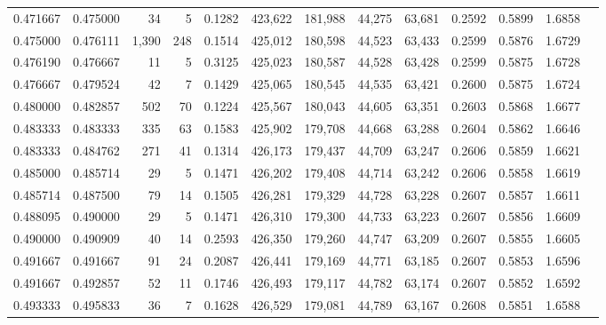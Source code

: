 \begin{tabular}{rrrrrrrrrrrrr}
0.471667 & 0.475000 &     34 &      5 &                                     0.1282 & 423,622 & 181,988 &  44,275 &  63,681 & 0.2592 & 0.5899 & 1.6858 \\
0.475000 & 0.476111 &  1,390 &    248 &                                     0.1514 & 425,012 & 180,598 &  44,523 &  63,433 & 0.2599 & 0.5876 & 1.6729 \\
0.476190 & 0.476667 &     11 &      5 &                                     0.3125 & 425,023 & 180,587 &  44,528 &  63,428 & 0.2599 & 0.5875 & 1.6728 \\
0.476667 & 0.479524 &     42 &      7 &                                     0.1429 & 425,065 & 180,545 &  44,535 &  63,421 & 0.2600 & 0.5875 & 1.6724 \\
0.480000 & 0.482857 &    502 &     70 &                                     0.1224 & 425,567 & 180,043 &  44,605 &  63,351 & 0.2603 & 0.5868 & 1.6677 \\
0.483333 & 0.483333 &    335 &     63 &                                     0.1583 & 425,902 & 179,708 &  44,668 &  63,288 & 0.2604 & 0.5862 & 1.6646 \\
0.483333 & 0.484762 &    271 &     41 &                                     0.1314 & 426,173 & 179,437 &  44,709 &  63,247 & 0.2606 & 0.5859 & 1.6621 \\
0.485000 & 0.485714 &     29 &      5 &                                     0.1471 & 426,202 & 179,408 &  44,714 &  63,242 & 0.2606 & 0.5858 & 1.6619 \\
0.485714 & 0.487500 &     79 &     14 &                                     0.1505 & 426,281 & 179,329 &  44,728 &  63,228 & 0.2607 & 0.5857 & 1.6611 \\
0.488095 & 0.490000 &     29 &      5 &                                     0.1471 & 426,310 & 179,300 &  44,733 &  63,223 & 0.2607 & 0.5856 & 1.6609 \\
0.490000 & 0.490909 &     40 &     14 &                                     0.2593 & 426,350 & 179,260 &  44,747 &  63,209 & 0.2607 & 0.5855 & 1.6605 \\
0.491667 & 0.491667 &     91 &     24 &                                     0.2087 & 426,441 & 179,169 &  44,771 &  63,185 & 0.2607 & 0.5853 & 1.6596 \\
0.491667 & 0.492857 &     52 &     11 &                                     0.1746 & 426,493 & 179,117 &  44,782 &  63,174 & 0.2607 & 0.5852 & 1.6592 \\
0.493333 & 0.495833 &     36 &      7 &                                     0.1628 & 426,529 & 179,081 &  44,789 &  63,167 & 0.2608 & 0.5851 & 1.6588 \\

\end{tabular}
